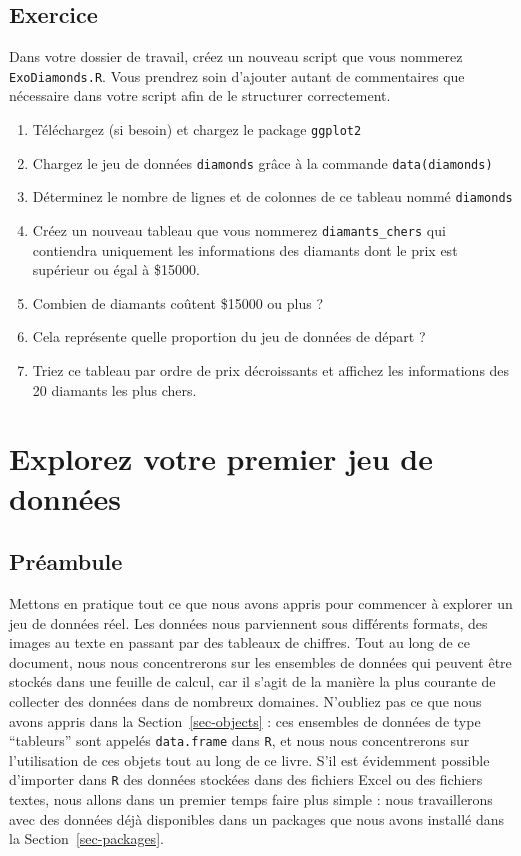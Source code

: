\documentclass[
  a4paper,
  DIV=11,
  numbers=noendperiod,
  oneside]{scrreprt}
\providecommand{\tightlist}{%
  \setlength{\itemsep}{0pt}\setlength{\parskip}{0pt}}\usepackage{longtable,booktabs,array}
\begin{document}
\section{Exercice}\label{sec-exo-1}

Dans votre dossier de travail, créez un nouveau script que vous nommerez
\texttt{ExoDiamonds.R}. Vous prendrez soin d'ajouter autant de
commentaires que nécessaire dans votre script afin de le structurer
correctement.

\begin{enumerate}
\def\labelenumi{\arabic{enumi}.}
\tightlist
\item
  Téléchargez (si besoin) et chargez le package \texttt{ggplot2}
\item
  Chargez le jeu de données \texttt{diamonds} grâce à la commande
  \texttt{data(diamonds)}
\item
  Déterminez le nombre de lignes et de colonnes de ce tableau nommé
  \texttt{diamonds}
\item
  Créez un nouveau tableau que vous nommerez \texttt{diamants\_chers}
  qui contiendra uniquement les informations des diamants dont le prix
  est supérieur ou égal à \$15000.
\item
  Combien de diamants coûtent \$15000 ou plus ?
\item
  Cela représente quelle proportion du jeu de données de départ ?
\item
  Triez ce tableau par ordre de prix décroissants et affichez les
  informations des 20 diamants les plus chers.
\end{enumerate}


\chapter{Explorez votre premier jeu de données}\label{sec-dataset}

\section{Préambule}\label{pruxe9ambule-1}

Mettons en pratique tout ce que nous avons appris pour commencer à
explorer un jeu de données réel. Les données nous parviennent sous
différents formats, des images au texte en passant par des tableaux de
chiffres. Tout au long de ce document, nous nous concentrerons sur les
ensembles de données qui peuvent être stockés dans une feuille de
calcul, car il s'agit de la manière la plus courante de collecter des
données dans de nombreux domaines. N'oubliez pas ce que nous avons
appris dans la Section~\ref{sec-objects} : ces ensembles de données de
type ``tableurs'' sont appelés \texttt{data.frame} dans \texttt{R}, et
nous nous concentrerons sur l'utilisation de ces objets tout au long de
ce livre. S'il est évidemment possible d'importer dans \texttt{R} des
données stockées dans des fichiers Excel ou des fichiers textes, nous
allons dans un premier temps faire plus simple : nous travaillerons avec
des données déjà disponibles dans un packages que nous avons installé
dans la Section~\ref{sec-packages}.
\end{document}
